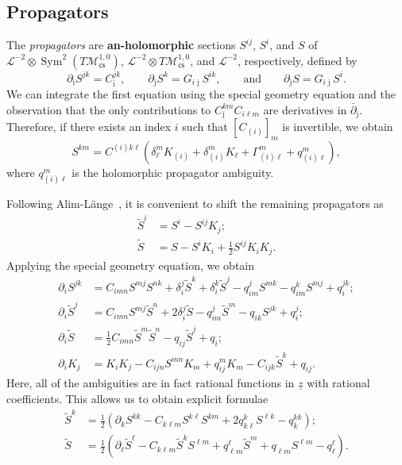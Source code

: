 \documentclass[10pt,oldfontcommands,oneside]{memoir}
\theoremstyle{definition}
\theoremstyle{remark}
\theoremstyle{plain}
\theoremstyle{definition}
\theoremstyle{remark}
\newcommand{\mc}[1]{\mathcal{#1}}
\newcommand{\uz}{\ul{z}}
\newcommand{\on}[1]{\operatorname{#1}}
\newcommand{\ms}[1]{\mathsf{#1}}
\newcommand{\ul}[1]{\underline{#1}}
\newcommand{\1}{\mathbf{1}}
\newcommand{\2}{\mathbf{2}}
\newcommand{\3}{\mathbf{3}}
\newcommand{\scs}{\ms{cs}}
\begin{document}
\subsection{Propagators}%
\label{sub:Propagators}

The \textit{propagators} are \textbf{an-holomorphic} sections $S^{ij}$, $S^i$, and $S$ of $\mc{L}^{-2}\otimes \on{Sym}^2(T\mc{M}_{\scs}^{1,0})$, $\mc{L}^{-2} \otimes T \mc{M}_{\scs}^{1,0}$, and $\mc{L}^{-2}$, respectively, defined by
\[ \partial_{\bar{\imath}} S^{jk} = C_{\bar{\imath}}^{jk}, \qquad \partial_{\bar{\jmath}} S^k = G_{i\bar{\jmath}} S^{ik}, \qquad \text{and} \qquad \partial_{\bar{\jmath}} S = G_{i\bar{\jmath}} S^i. \]
We can integrate the first equation using the special geometry equation and the observation that the only contributions to $C_{\bar{\jmath}}^{km} C_{i\ell m}$ are derivatives in $\bar{\partial}_{\bar{\jmath}}$. Therefore, if there exists an index $i$ such that $[C_{(i)}]_m$ is invertible, we obtain
\[ S^{km} = C^{(i)k\ell} (\delta_{\ell}^m K_{(i)} + \delta_{(i)}^m K_{\ell} + \Gamma^m_{(i)\ell} + q_{(i)\ell}^m), \]
where $q_{(i)\ell}^m$ is the holomorphic propagator ambiguity.

Following Alim-L\"ange~\cite{alimlange}, it is convenient to shift the remaining propagators as
\begin{align*}
    \tilde{S}^i &= S^i - S^{ij}K_j; \\
    \tilde{S} &= S - S^i K_i + \frac{1}{2} S^{ij} K_i K_j.
\end{align*}
Applying the special geometry equation, we obtain
\begin{align*}
    \partial_i S^{jk} &= C_{imn}S^{mj} S^{nk} + \delta_i^j\tilde{S}^k + \delta_i^k\tilde{S}^j - q_{im}^j S^{mk} - q_{im}^k S^{mj} + q_i^{jk}; \\
    \partial_i \tilde{S}^j &= C_{imn} S^{mj} \tilde{S}^n + 2 \delta_i^j\tilde{S} - q_{im}^j \tilde{S}^m - q_{ik}S^{jk} + q_i^j; \\
    \partial_i \tilde{S} &= \frac{1}{2} C_{imn}\tilde{S}^m \tilde{S}^n - q_{ij} \tilde{S}^j + q_i; \\
    \partial_i K_j &= K_i K_j - C_{ijn} S^{mn}K_m + q_{ij}^m K_m - C_{ijk} \tilde{S}^k + q_{ij}.
\end{align*}
Here, all of the ambiguities are in fact rational functions in $\uz$ with rational coefficients. This allows us to obtain explicit formulae
\begin{align*}
    \tilde{S}^k &= \frac{1}{2}(\partial_k S^{kk} - C_{k\ell m} S^{k\ell} S^{km} + 2 q_{k\ell}^k S^{\ell k} - q_k^{kk}); \\
    \tilde{S} &= \frac{1}{2} (\partial_{\ell}\tilde{S}^{\ell} - C_{k\ell m} \tilde{S}^k S^{\ell m} + q_{\ell m}^{\ell} \tilde{S}^m + q_{\ell m} S^{\ell m} - q_{\ell}^{\ell}). 
\end{align*}
\end{document}
